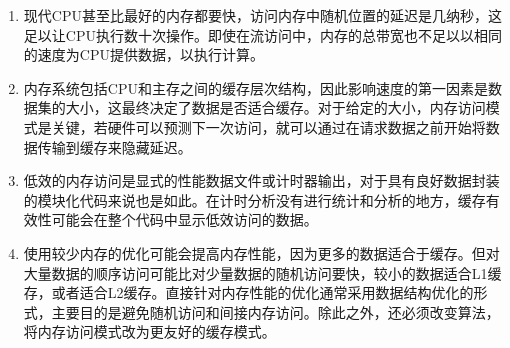 \begin{enumerate}
\item 
现代CPU甚至比最好的内存都要快，访问内存中随机位置的延迟是几纳秒，这足以让CPU执行数十次操作。即使在流访问中，内存的总带宽也不足以以相同的速度为CPU提供数据，以执行计算。

\item 
内存系统包括CPU和主存之间的缓存层次结构，因此影响速度的第一因素是数据集的大小，这最终决定了数据是否适合缓存。对于给定的大小，内存访问模式是关键，若硬件可以预测下一次访问，就可以通过在请求数据之前开始将数据传输到缓存来隐藏延迟。

\item 
低效的内存访问是显式的性能数据文件或计时器输出，对于具有良好数据封装的模块化代码来说也是如此。在计时分析没有进行统计和分析的地方，缓存有效性可能会在整个代码中显示低效访问的数据。

\item
使用较少内存的优化可能会提高内存性能，因为更多的数据适合于缓存。但对大量数据的顺序访问可能比对少量数据的随机访问要快，较小的数据适合L1缓存，或者适合L2缓存。直接针对内存性能的优化通常采用数据结构优化的形式，主要目的是避免随机访问和间接内存访问。除此之外，还必须改变算法，将内存访问模式改为更友好的缓存模式。

\end{enumerate}